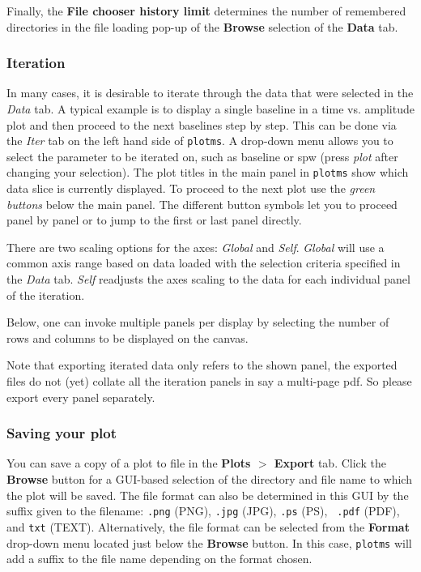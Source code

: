 Finally, the {\bf File chooser history limit} determines the number of
remembered directories in the file loading pop-up of the {\bf Browse}
selection of the {\bf Data} tab.


\subsubsection{Iteration}
\label{section:edit.plot.plotms.iter}

In many cases, it is desirable to iterate through the data that were
selected in the {\it Data} tab. A typical example is to display a
single baseline in a time vs. amplitude plot and then proceed to the
next baselines step by step. This can be done via the {\it Iter} tab
on the left hand side of {\tt plotms}. A drop-down menu allows you to
select the parameter to be iterated on, such as baseline or spw (press
{\it plot} after changing your selection). The plot titles in the main
panel in {\tt plotms} show which data slice is currently displayed. To
proceed to the next plot use the {\it green buttons} below the main
panel. The different button symbols let you to proceed panel by panel
or to jump to the first or last panel directly.
 

There are two scaling options for the axes: {\it Global} and {\it
  Self}. {\it Global} will use a common axis range based on data
loaded with the selection criteria specified in the {\it Data}
tab. {\it Self} readjusts the axes scaling to the data for each
individual panel of the iteration. 

Below, one can invoke multiple panels per display by selecting the
number of rows and columns to be displayed on the canvas.


Note that exporting iterated data only refers to the shown panel, the
exported files do not (yet) collate all the iteration panels in say a
multi-page pdf. So please export every panel separately.




\subsubsection{Saving your plot}
\label{section:edit.plot.plotms.save}

You can save a copy of a plot to file in the {\bf Plots $>$ Export}
tab. Click the {\bf Browse} button for a GUI-based selection of the
directory and file name to which the plot will be saved. The file
format can also be determined in this GUI by the suffix given to the
filename: {\tt .png} (PNG), {\tt .jpg} (JPG), {\tt .ps} (PS), {\tt
  .pdf} (PDF), and {\tt txt} (TEXT). Alternatively, the file format can
be selected from the {\bf Format} drop-down menu located just below
the {\bf Browse} button. In this case, {\tt plotms} will add a suffix
to the file name depending on the format chosen.

